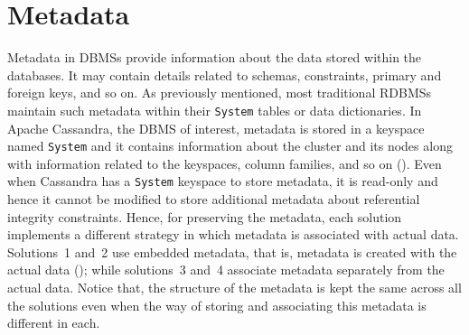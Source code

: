 \section{Metadata}\label{s:design-Metadata}
Metadata in \acp{DBMS} provide information about the data stored within the
databases.
It may contain details related to schemas, constraints,  primary and foreign keys, and
so on.   As previously mentioned,  most traditional \acp{RDBMS} maintain such
metadata within their \texttt{System}  tables or data dictionaries.  
In Apache Cassandra, the \ac{DBMS} of interest, metadata is stored in a 
keyspace named \texttt{System} and it contains information
about the cluster and its nodes along with information related to the
keyspaces, column families, and so on ().
 Even when Cassandra has a  \texttt{System} keyspace to store metadata, it 
 is read-only and hence it cannot be modified to store additional metadata
 about referential integrity constraints. 
Hence,  for preserving the metadata, each 
solution implements a  different strategy in which metadata is associated
with actual data. Solutions~1 and~2 use embedded metadata, that is, metadata
is created with the actual data (); while solutions~3 and~4
associate metadata separately from the actual data.  Notice that, the structure
 of the metadata is kept the same across all the solutions even when  the way of
 storing and associating this metadata is different in each. 

